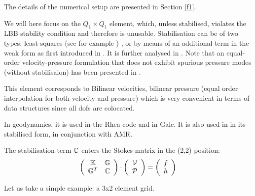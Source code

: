 The details of the numerical setup are presented in Section \ref{f1}.

We will here focus on the $Q_1 \times Q_1$ element, which, unless stabilised,
violates  the LBB stability condition and therefore is unusable. 
Stabilisation can be of two types: least-squares (see for example \cite{dohu03}) 
\cite{temr12,kibr,gubl06},
or by means of an additional term in the weak form as first introduced in \cite{dobo04,bodg06}.
It is further analysed in \cite{nosi01,lihc09}.
Note that an equal-order velocity-pressure formulation that does not exhibit spurious
pressure modes (without stabilisaion) has been presented in \cite{risc86}.

This element corresponds to Bilinear velocities, bilinear pressure (equal order interpolation for both
velocity and pressure) which is very convenient in terms of data structures since all dofs 
are colocated.

In geodynamics, it is used in the Rhea code \cite{stgb10,busa13} and in Gale.
It is also used in \cite{lezh11} in its stabilised form, in conjunction with AMR. 

The stabilisation term ${\mathbb{C}}$ enters the Stokes matrix in the (2,2) position:
\[
\left(
\begin{array}{cc}
{\mathbb{K}} & {\mathbb{G}} \\ {\mathbb{G}}^T & {\mathbb{C}} 
\end{array}
\right)
\cdot
\left(
\begin{array}{c}
{\cal V} \\ {\cal P}
\end{array}
\right)
=
\left(
\begin{array}{c}
 f \\ h
\end{array}
\right)
\]

Let us take a simple example: a 3x2 element grid.


